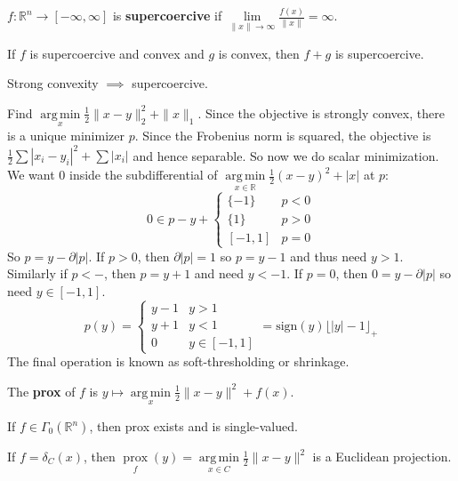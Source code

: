 \documentclass[english, 11pt]{article}
\DeclareMathOperator*{\argmin}{arg\,min}
\DeclareMathOperator*{\prox}{prox}
\begin{document}
\begin{defn}[Supercoercive]
$f:\mathbb{R}^n \to [-\infty,\infty]$ is {\bf supercoercive} if $\lim \limits_{\|x\|\to \infty} \frac{f(x)}{\|x\|} = \infty$.
\end{defn}

\begin{thrm}
If $f$ is supercoercive and convex and $g$ is convex, then $f+g$ is supercoercive.
\end{thrm}

\begin{thrm}
Strong convexity $\implies$ supercoercive.
\end{thrm}



\begin{exmp}
Find $\argmin \limits_x \frac{1}{2} \|x-y\|_2^2 +  \|x\|_1$. Since the objective is strongly convex, there is a unique minimizer $p$. 
Since the Frobenius norm is squared, the objective is $\frac{1}{2} \sum |x_i-y_i|^2 + \sum |x_i|$ and hence separable. So now we do scalar minimization. We want 0 inside the subdifferential of $\argmin \limits_{x \in \mathbb{R}} \frac{1}{2} (x-y)^2 + |x|$ at $p$:
\[
0 \in p-y + \begin{cases} \{-1\} & p <0 \\ \{1 \} & p >0 \\ [-1,1] & p =0 \end{cases}
\]
So $p = y - \partial |p|$. If $p>0$, then $\partial|p|=1$ so $p=y-1$ and thus need $y>1$. Similarly if $p<-$, then $p=y+1$ and need $y<-1$.
 If $p=0$, then $0=y-\partial |p|$ so need $y \in [-1,1]$. 
 \[
 p(y) = \begin{cases} y-1 & y>1 \\ y+1 & y<1 \\ 0 & y \in [-1,1] \end{cases} = \text{sign}(y) \lfloor |y|-1 \rfloor_+
 \]
 The final operation is known as soft-thresholding or shrinkage.
 \end{exmp}
 
 
 \begin{defn}
 The {\bf prox} of $f$ is $y \mapsto \argmin \limits_x \frac{1}{2} \|x-y\|^2 + f(x)$.
 \end{defn}
 
 \begin{thrm}
 If $f \in \Gamma_0(\mathbb{R}^n)$, then prox exists and is single-valued.
 \end{thrm}
 
 \begin{exmp}
 If $f = \delta_C(x)$, then $\prox \limits_f(y) = \argmin \limits_{x \in C} \frac{1}{2} \|x-y\|^2$ is a Euclidean projection.
 \end{exmp}
 
\end{document}
